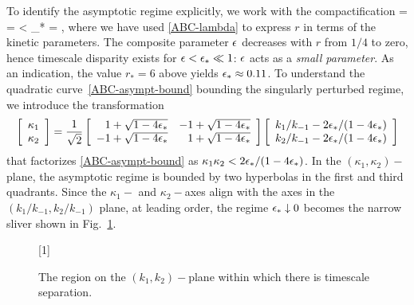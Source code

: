 To identify the asymptotic regime explicitly, we work with the compactification
%
\be
 \eps
=
=
<
 \eps_*
=
 ,
\label{ABC-asympt-bound}
\ee
%
where we have used \eqref{ABC-lambda} to express $r$ in terms of the kinetic parameters.
The composite parameter $\epsilon$ decreases with $r$ from $1/4$ to zero,
hence timescale disparity exists for $\epsilon < \epsilon_* \ll 1$: $\epsilon$ acts as a \emph{small parameter}.
As an indication, the value $r_*=6$ above yields $\epsilon_* \approx 0.11$.
To understand the quadratic curve~\eqref{ABC-asympt-bound} bounding the singularly perturbed regime,
we introduce the transformation
%
\[
\left[\begin{array}{c}
 \kappa_1 \\ \kappa_2
\end{array}\right]
=
 \frac{1}{\sqrt2}
%
\left[\begin{array}{rr}
 1+\sqrt{1-4\eps_*} & -1+\sqrt{1-4\eps_*} \\ -1+\sqrt{1-4\eps_*} & 1+\sqrt{1-4\eps_*}
\end{array}\right]
%
\left[\begin{array}{c}
 k_1/k_{-1} - 2 \eps_*/(1 - 4 \eps_*) \\ k_2/k_{-1} - 2 \eps_*/(1 - 4 \eps_*)
\end{array}\right]
\]
%
that factorizes \eqref{ABC-asympt-bound} as $\kappa_1 \kappa_2 < 2 \epsilon_*/(1 - 4 \epsilon_*)$.
In the $(\kappa_1,\kappa_2)-$plane, the asymptotic regime is bounded by two hyperbolas in the first and third quadrants.
Since the $\kappa_1-$ and $\kappa_2-$axes align with the axes in the $(k_1/k_{-1},k_2/k_{-1})$ plane, at leading order,
the regime $\epsilon_* \downarrow 0$ becomes the narrow sliver shown in Fig.~\ref{f-regim}.\\
%
\begin{figure}[t]
\scalebox{1}[1]{
}
\caption{\label{f-regim}
The region on the $(k_1,k_2)-$plane within which there is timescale separation.
}
\end{figure}
%

